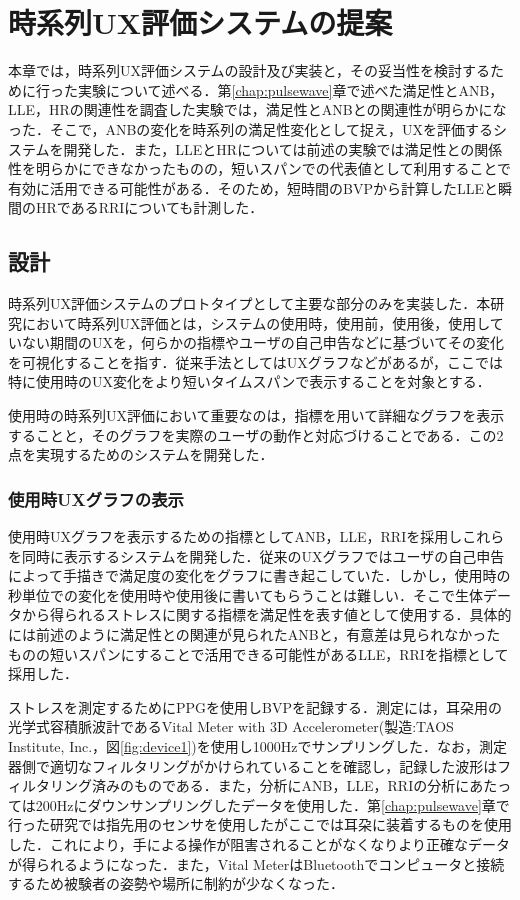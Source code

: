 \chapter{時系列UX評価システムの提案}
\label{chap:sequential}

本章では，時系列UX評価システムの設計及び実装と，その妥当性を検討するために行った実験について述べる．第\ref{chap:pulsewave}章で述べた満足性とANB，LLE，HRの関連性を調査した実験では，満足性とANBとの関連性が明らかになった．そこで，ANBの変化を時系列の満足性変化として捉え，UXを評価するシステムを開発した．また，LLEとHRについては前述の実験では満足性との関係性を明らかにできなかったものの，短いスパンでの代表値として利用することで有効に活用できる可能性がある．そのため，短時間のBVPから計算したLLEと瞬間のHRであるRRIについても計測した．

\section{設計}

時系列UX評価システムのプロトタイプとして主要な部分のみを実装した．本研究において時系列UX評価とは，システムの使用時，使用前，使用後，使用していない期間のUXを，何らかの指標やユーザの自己申告などに基づいてその変化を可視化することを指す．従来手法としてはUXグラフなどがあるが，ここでは特に使用時のUX変化をより短いタイムスパンで表示することを対象とする．

使用時の時系列UX評価において重要なのは，指標を用いて詳細なグラフを表示することと，そのグラフを実際のユーザの動作と対応づけることである．この2点を実現するためのシステムを開発した．

\subsection{使用時UXグラフの表示}

使用時UXグラフを表示するための指標としてANB，LLE，RRIを採用しこれらを同時に表示するシステムを開発した．従来のUXグラフではユーザの自己申告によって手描きで満足度の変化をグラフに書き起こしていた．しかし，使用時の秒単位での変化を使用時や使用後に書いてもらうことは難しい．そこで生体データから得られるストレスに関する指標を満足性を表す値として使用する．具体的には前述のように満足性との関連が見られたANBと，有意差は見られなかったものの短いスパンにすることで活用できる可能性があるLLE，RRIを指標として採用した．

ストレスを測定するためにPPGを使用しBVPを記録する．測定には，耳朶用の光学式容積脈波計であるVital Meter with 3D Accelerometer(製造:TAOS Institute, Inc.，図\ref{fig:device1})を使用し1000Hzでサンプリングした．なお，測定器側で適切なフィルタリングがかけられていることを確認し，記録した波形はフィルタリング済みのものである．また，分析にANB，LLE，RRIの分析にあたっては200Hzにダウンサンプリングしたデータを使用した．第\ref{chap:pulsewave}章で行った研究では指先用のセンサを使用したがここでは耳朶に装着するものを使用した．これにより，手による操作が阻害されることがなくなりより正確なデータが得られるようになった．また，Vital MeterはBluetoothでコンピュータと接続するため被験者の姿勢や場所に制約が少なくなった．

